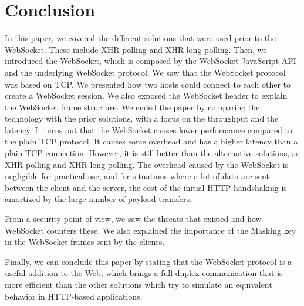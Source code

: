 \documentclass[journal,compsoc]{IEEEtran}
\newcommand{\ws}{WebSocket}
\begin{document}
\section{Conclusion}
In this paper, we covered the different solutions that were used prior to the \ws{}.
These include XHR polling and XHR long-polling.
Then, we introduced the \ws{}, which is composed by the \ws{} JavaScript API and the underlying \ws{} protocol.
We saw that the \ws{} protocol was based on TCP.
We presented how two hosts could connect to each other to create a \ws{} session.
We also exposed the \ws{} header to explain the \ws{} frame structure.
We ended the paper by comparing the technology with the prior solutions, with a focus on the throughput and the latency.
It turns out that the \ws{} causes lower performance compared to the plain TCP protocol.
It causes some overhead and has a higher latency than a plain TCP connection.
However, it is still better than the alternative solutions, as XHR polling and XHR long-polling.
The overhead caused by the \ws{} is negligible for practical use, and for situations where a lot of data are sent between the client and the server, the cost of the initial HTTP handshaking is amortized by the large number of payload transfers.

From a security point of view, we saw the threats that existed and how \ws{} counters these.
We also explained the importance of the Masking key in the \ws{} frames sent by the clients.

Finally, we can conclude this paper by stating that the \ws{} protocol is a useful addition to the Web, which brings a full-duplex communication that is more efficient than the other solutions which try to simulate an equivalent behavior in HTTP-based applications.

\ifCLASSOPTIONcaptionsoff
  \newpage
\fi




\end{document}
